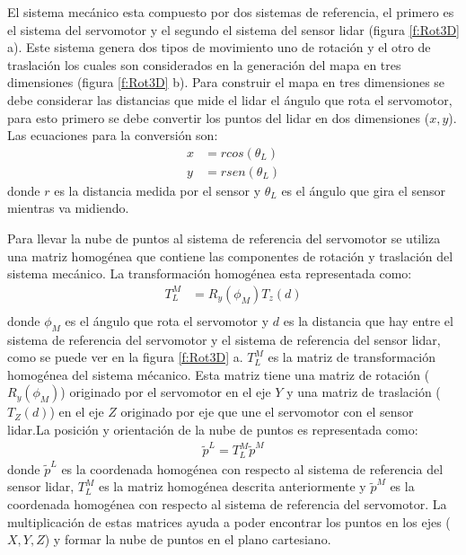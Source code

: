 El sistema mecánico esta compuesto por dos sistemas de referencia, el primero es el sistema 
del servomotor y el segundo el sistema del sensor lidar (figura \ref{f:Rot3D} a). Este sistema
genera dos tipos de movimiento uno de rotación y el otro de traslación los cuales son considerados
en la generación del mapa en tres dimensiones (figura \ref{f:Rot3D} b). Para construir el mapa en 
tres dimensiones se debe considerar las distancias que mide el lidar el ángulo que rota el 
servomotor, para esto primero se debe convertir los puntos del lidar en dos dimensiones 
($x,y$). Las ecuaciones para la conversión son:
\begin{align*}
	x &= rcos(\theta_{L}) \\
	y &= rsen(\theta_{L})
\end{align*}
donde $r$ es la distancia medida por el sensor y $\theta_{L}$ es el ángulo que gira el sensor 
mientras va midiendo.

Para llevar la nube de puntos al sistema de referencia del servomotor se utiliza una matriz 
homogénea que contiene las componentes de rotación y traslación del sistema mecánico. La transformación
homogénea esta representada como:
\begin{align*}
	T_{L}^{M} &= R_{y}(\phi_{M}) T_{z}(d) \\
\end{align*}
donde $\phi_{M}$ es el ángulo que rota el servomotor y $d$ es la distancia que hay entre el sistema de 
referencia del servomotor y el sistema de referencia del sensor lidar, como se puede ver en la 
figura \ref{f:Rot3D} a. $T_{L}^{M}$ es la matriz de transformación homogénea del sistema mécanico. Esta 
matriz tiene una matriz de rotación ($R_{y}(\phi_{M})$) originado por el servomotor en el eje $Y$ y una
matriz de traslación ($T_{Z}(d)$) en el eje $Z$ originado por eje que une el servomotor con el sensor 
lidar.La posición y orientación de la nube de puntos es representada como:
\begin{align}
	\tilde{p}^{L} = T_{L}^{M} \tilde{p}^{M}
	\label{eqn:MatrizHomogenea}
\end{align}
donde $\tilde{p}^{L}$ es la coordenada homogénea con respecto al sistema de referencia del sensor
lidar, $T_{L}^{M}$ es la matriz homogénea descrita anteriormente y $\tilde{p}^{M}$ es la coordenada 
homogénea con respecto al sistema de referencia del servomotor. La multiplicación de estas matrices
ayuda a poder encontrar los puntos en los ejes ($X,Y,Z$) y formar la nube de puntos en el plano 
cartesiano.

